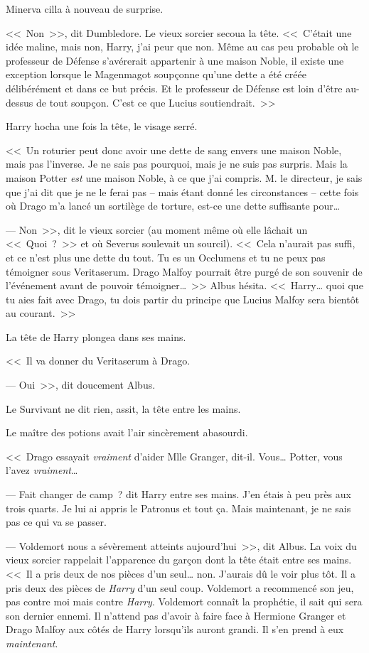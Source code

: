 Minerva cilla à nouveau de surprise.

<<~Non~>>, dit Dumbledore. Le vieux sorcier secoua la tête. <<~C'était une idée maline, mais non, Harry, j'ai peur que non. Même au cas peu probable où le professeur de Défense s'avérerait appartenir à une maison Noble, il existe une exception lorsque le Magenmagot soupçonne qu'une dette a été créée délibérément et dans ce but précis. Et le professeur de Défense est loin d'être au-dessus de tout soupçon. C'est ce que Lucius soutiendrait.~>>

Harry hocha une fois la tête, le visage serré.

<<~Un roturier peut donc avoir une dette de sang envers une maison Noble, mais pas l'inverse. Je ne sais pas pourquoi, mais je ne suis pas surpris. Mais la maison Potter \emph{est} une maison Noble, à ce que j'ai compris. M. le directeur, je sais que j'ai dit que je ne le ferai pas -- mais étant donné les circonstances -- cette fois où Drago m'a lancé un sortilège de torture, est-ce une dette suffisante pour…

--- Non~>>, dit le vieux sorcier (au moment même où elle lâchait un <<~Quoi~?~>> et où Severus soulevait un sourcil). <<~Cela n'aurait pas suffi, et ce n'est plus une dette du tout. Tu es un Occlumens et tu ne peux pas témoigner sous Veritaserum. Drago Malfoy pourrait être purgé de son souvenir de l'événement avant de pouvoir témoigner…~>> Albus hésita. <<~Harry… quoi que tu aies fait avec Drago, tu dois partir du principe que Lucius Malfoy sera bientôt au courant.~>>

La tête de Harry plongea dans ses mains.

<<~Il va donner du Veritaserum à Drago.

--- Oui~>>, dit doucement Albus.

Le Survivant ne dit rien, assit, la tête entre les mains.

Le maître des potions avait l'air sincèrement abasourdi.

<<~Drago essayait \emph{vraiment} d'aider Mlle Granger, dit-il. Vous… Potter, vous l'avez \emph{vraiment}…

--- Fait changer de camp~? dit Harry entre ses mains. J'en étais à peu près aux trois quarts. Je lui ai appris le Patronus et tout ça. Mais maintenant, je ne sais pas ce qui va se passer.

--- Voldemort nous a sévèrement atteints aujourd'hui~>>, dit Albus. La voix du vieux sorcier rappelait l'apparence du garçon dont la tête était entre ses mains. <<~Il a pris deux de nos pièces d'un seul… non. J'aurais dû le voir plus tôt. Il a pris deux des pièces de \emph{Harry} d'un seul coup. Voldemort a recommencé son jeu, pas contre moi mais contre \emph{Harry}. Voldemort connaît la prophétie, il sait qui sera son dernier ennemi. Il n'attend pas d'avoir à faire face à Hermione Granger et Drago Malfoy aux côtés de Harry lorsqu'ils auront grandi. Il s'en prend à eux \emph{maintenant}.

